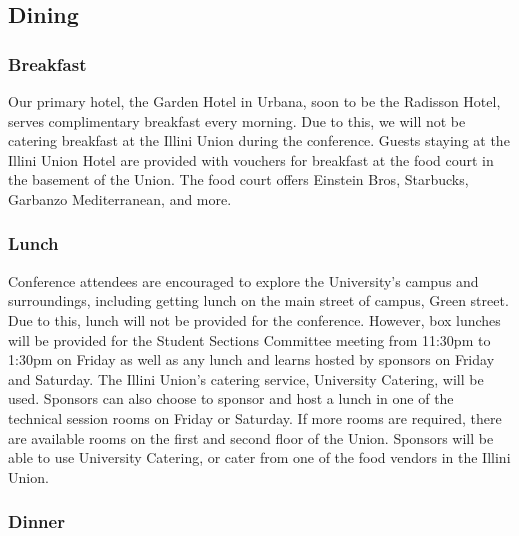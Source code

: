 \subsection{Dining}
\subsubsection{Breakfast}
Our primary hotel, the Garden Hotel in Urbana, soon to be the Radisson Hotel, serves complimentary breakfast every morning. Due to this, we will not be catering breakfast at the Illini Union during the conference. Guests staying at the Illini Union Hotel are provided with vouchers for breakfast at the food court in the basement of the Union. The food court offers Einstein Bros, Starbucks, Garbanzo Mediterranean, and more. 
\subsubsection{Lunch}
Conference attendees are encouraged to explore the University’s campus and surroundings, including getting lunch on the main street of campus, Green street. Due to this, lunch will not be provided for the conference. However, box lunches will be provided for the Student Sections Committee meeting from 11:30pm to 1:30pm on Friday as well as any lunch and learns hosted by sponsors on Friday and Saturday. The Illini Union’s catering service, University Catering, will be used. Sponsors can also choose to sponsor and host a lunch in one of the technical session rooms on Friday or Saturday. If more rooms are required, there are available rooms on the first and second floor of the Union. Sponsors will be able to use University Catering, or cater from one of the food vendors in the Illini Union.
\subsubsection{Dinner}

